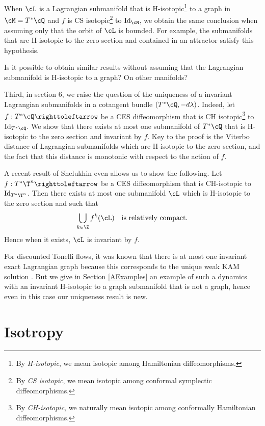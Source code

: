 When $\cL$ is a Lagrangian submanifold that is H-isotopic\footnote{By \emph{H-isotopic}, we mean isotopic among Hamiltonian diffeomorphisms.} to a graph in $\cM=T^*\cQ$ and $f$ is CS isotopic\footnote{By {\sl CS isotopic}, we mean isotopic among conformal symplectic diffeomorphisms.} to ${\rm Id}_\cM$, we obtain the same conclusion when assuming only that the orbit of $\cL$ is bounded. For example, the submanifolds that are H-isotopic to the zero section and contained in an attractor satisfy this hypothesis.

\begin{question*}
Is it possible to obtain similar results without assuming that the Lagrangian submanifold is H-isotopic to a graph? On other manifolds?
\end{question*}

Third, in section 6, we raise the question of the uniqueness of a invariant Lagrangian submanifolds in a cotangent bundle $(T^*\cQ, -d\lambda)$. Indeed, let $f:T^*\cQ \righttoleftarrow$ be a CES diffeomorphism that is CH isotopic\footnote{By \emph{CH-isotopic}, we naturally mean isotopic among conformally Hamiltonian diffeomorphisms.} to ${\rm Id}_{T^*\cQ}$. We show that there exists at most one submanifold of $T^*\cQ$ that is H-isotopic to the zero section and invariant by $f$. Key to the proof is the Viterbo distance of Lagrangian submanifolds which are H-isotopic to the zero section, and the fact that this distance is monotonic with respect to the action of $f$.

A recent result of Shelukhin even allows us to show the following. Let $f:T^*\T^n \righttoleftarrow$ be a CES diffeomorphism that is CH-isotopic to ${\rm Id}_{T^*\T^n}$. Then there exists at most one submanifold $\cL$ which is H-isotopic to the zero section and such that
\[
\bigcup_{k\in\Z}f^k(\cL)\quad\text{is relatively compact}.
\]
Hence when it exists, $\cL$ is invariant by $f$.

For discounted Tonelli flows, it was known that there is at most one invariant exact Lagrangian graph because this corresponds to the unique weak KAM solution \cite{MarSor2017}. But we give in Section \ref{AExamples} an example of such a dynamics with an invariant H-isotopic to a graph submanifold that is not a graph, hence even in this case our uniqueness result is new.

\section{Isotropy}\label{Sisotropy}

